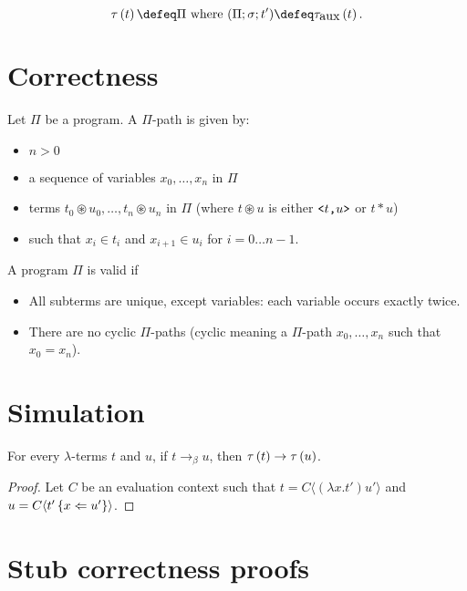 \documentclass{article}
\begin{document}
\[\ltrans{t} \defeq \cuts \mbox{ where } (\cuts; \sigma; t') \defeq \ltransaux{t}. \]

\section{Correctness}

\begin{definition}[$\Pi$-path]
    Let $\Pi$ be a program. A $\Pi$-path is given by:
    \begin{itemize}
        \item $n > 0$
        \item a sequence of variables $x_0, \ldots, x_n$ in $\Pi$
        \item terms $t_0 \circledast u_0, \ldots, t_n \circledast u_n$ in $\Pi$ (where $t \circledast u$ is either $\mbox{\normalfont\texttt{<}} t \mbox{\normalfont\texttt{,}} u\mbox{\normalfont\texttt{>}}$ or $t * u$)
        \item such that $x_i \in t_i$ and $x_{i+1}\in u_i$ for $i=0\ldots n-1$.
    \end{itemize}
\end{definition}

\begin{definition}
    A program $\Pi$ is valid if
    \begin{itemize}
        \item All subterms are unique, except variables: each variable occurs exactly twice.
        \item There are no cyclic $\Pi$-paths (cyclic meaning a $\Pi$-path $x_0, \ldots, x_n$ such that $x_0 = x_n$).
    \end{itemize}
\end{definition}

\section{Simulation}

\begin{theorem}
    For every $\lambda$-terms $t$ and $u$, if $t \to_\beta u$,
    then $\tau\left(t\right) \to \tau\left(u\right)$.
\end{theorem}
\begin{proof}
    Let $C$ be an evaluation context such that $t = C\langle(\lambda x. t')u'\rangle$ and $u = C\langle t'\left\{x\Leftarrow u'\right\}\rangle$.
\end{proof}


\newpage

\section{Stub correctness proofs}
\end{document}
